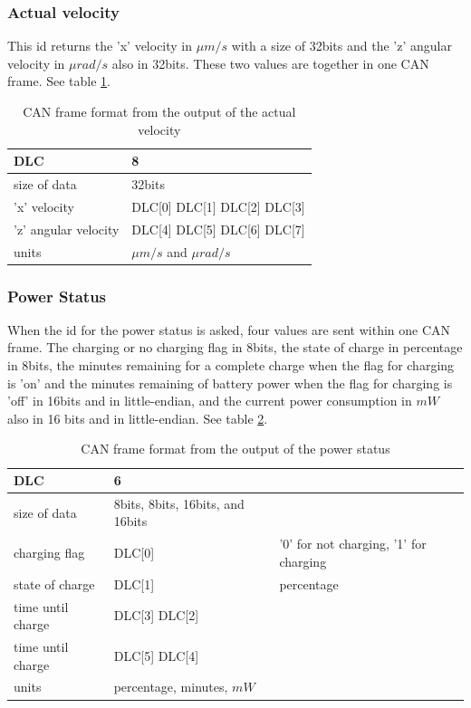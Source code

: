 \documentclass[12pt]{report}%
\begin{document}
\subsubsection{Actual velocity}
This id returns the 'x' velocity in $\mu m/s$ with a size of 32bits and the 'z' angular velocity in $\mu rad/s$ also in 32bits. These two values are together in one CAN frame. See table \ref{tab:velocity}.

\begin{table}[h!]
\centering
\begin{tabular}{|l|l|}
	\hline
	DLC										&	8														\\	\hline
	size of data					&	32bits											\\	\hline
	'x' velocity					&	DLC[0] DLC[1] DLC[2] DLC[3]	\\	\hline
	'z'	angular velocity	&	DLC[4] DLC[5] DLC[6] DLC[7]	\\	\hline
	units									&	$\mu m/s$ and $\mu rad/s$		\\	\hline
\end{tabular}
\caption{\label{tab:velocity} CAN frame format from the output of the actual velocity}
\end{table}

\subsubsection{Power Status}
When the id for the power status is asked, four values are sent within one CAN frame. The charging or no charging flag in 8bits, the state of charge in percentage in 8bits, the minutes remaining for a complete charge when the flag for charging is 'on' and the minutes remaining of battery power when the flag for charging is 'off' in 16bits and in little-endian, and the current power consumption in $mW$ also in 16 bits and in little-endian. See table \ref{tab:powerstatus}.

\begin{table}[h!]
\centering
\begin{tabular}{|l|l|l|}
	\hline
	DLC										&	6																	&																					\\	\hline
	size of data					&	8bits, 8bits, 16bits, and 16bits	&																					\\	\hline
	charging flag					&	DLC[0]														& '0' for not charging, '1' for charging	\\	\hline
	state of charge				&	DLC[1] 														&	percentage															\\	\hline
	time until charge			&	DLC[3] DLC[2] 										&																					\\	\hline
	time until charge			&	DLC[5] DLC[4] 										&																					\\	\hline
	units									&	percentage, minutes, $mW$					&																					\\	\hline
\end{tabular}
\caption{\label{tab:powerstatus} CAN frame format from the output of the power status}
\end{table}
\end{document}

